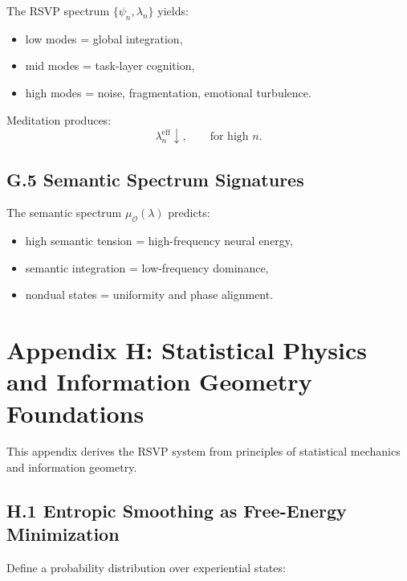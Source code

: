 \documentclass[12pt]{article}
\begin{document}
The RSVP spectrum $\{\psi_n,\lambda_n\}$ yields:

\begin{itemize}
\item low modes = global integration,
\item mid modes = task-layer cognition,
\item high modes = noise, fragmentation, emotional turbulence.
\end{itemize}

Meditation produces:
\[
\lambda_n^{\text{eff}} \downarrow,
\qquad
\text{for high } n.
\]

\subsection*{G.5 Semantic Spectrum Signatures}

The semantic spectrum $\mu_{\mathcal{O}}(\lambda)$ predicts:

\begin{itemize}
    \item high semantic tension = high-frequency neural energy,
    \item semantic integration = low-frequency dominance,
    \item nondual states = uniformity and phase alignment.
\end{itemize}


\section*{Appendix H: Statistical Physics and Information Geometry Foundations}

This appendix derives the RSVP system from principles of statistical mechanics
and information geometry.

\subsection*{H.1 Entropic Smoothing as Free-Energy Minimization}

Define a probability distribution over experiential states:
\end{document}
